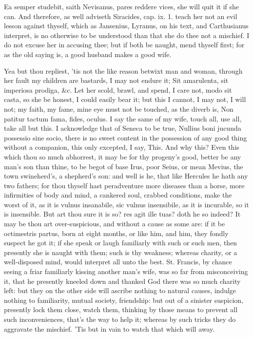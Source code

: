 {Ea semper studebit, saith Nevisanus, pares reddere vices, she
will quit it if she can. And therefore, as well adviseth Siracides,
cap. ix. 1. teach her not an evil lesson against thyself, which as
Jansenius, Lyranus, on his text, and Carthusianus interpret, is no
otherwise to be understood than that she do thee not a mischief. I do
not excuse her in accusing thee; but if both be naught, mend thyself
first; for as the old saying is, a good husband makes a good wife.

Yea but thou repliest, 'tis not the like reason betwixt man and woman,
through her fault my children are bastards, I may not endure it;
Sit amarulenta, sit imperiosa prodiga, \&c. Let her scold, brawl,
and spend, I care not, modo sit casta, so she be honest, I could easily
bear it; but this I cannot, I may not, I will not; my faith, my fame,
mine eye must not be touched, as the diverb is, Non patitur tactum
fama, fides, oculus. I say the same of my wife, touch all, use all,
take all but this. I acknowledge that of Seneca to be true, Nullius
boni jucunda possessio sine socio, there is no sweet content in the
possession of any good thing without a companion, this only excepted, I
say, This. And why this? Even this which thou so much abhorrest, it may
be for thy progeny's good,  better be any man's son than thine,
to be begot of base Irus, poor Seius, or mean Mevius, the town
swineherd's, a shepherd's son: and well is he, that like Hercules he
hath any two fathers; for thou thyself hast peradventure more diseases
than a horse, more infirmities of body and mind, a cankered soul,
crabbed conditions, make the worst of it, as it is vulnus insanabile,
sic vulnus insensibile, as it is incurable, so it is insensible. But
art thou sure it is so? res agit ille tuas? doth he so indeed? It
may be thou art over-suspicious, and without a cause as some are: if it
be octimestris partus, born at eight months, or like him, and him, they
fondly suspect he got it; if she speak or laugh familiarly with such or
such men, then presently she is naught with them; such is thy weakness;
whereas charity, or a well-disposed mind, would interpret all unto the
best. St. Francis, by chance seeing a friar familiarly kissing another
man's wife, was so far from misconceiving it, that he presently kneeled
down and thanked God there was so much charity left: but they on the
other side will ascribe nothing to natural causes, indulge nothing to
familiarity, mutual society, friendship: but out of a sinister
suspicion, presently lock them close, watch them, thinking by those
means to prevent all such inconveniences, that's the way to help it;
whereas by such tricks they do aggravate the mischief. 'Tis but in vain
to watch that which will away.

}

